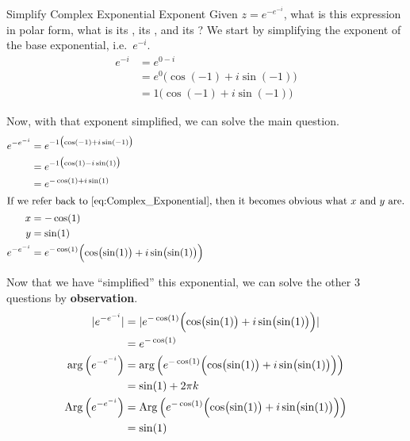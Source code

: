 \begin{example}[Lecture 3]{Simplify Complex Exponential Exponent}
  Given $z = e^{-e^{-i}}$, what is this expression in polar form, what is its , its , and its ?
  \tcblower{}
  We start by simplifying the exponent of the base exponential, i.e.\ $e^{-i}$.
  \begin{align*}
    e^{-i} &= e^{0 - i} \\
           &= e^{0} \bigl( \cos(-1) + i \sin(-1) \bigr) \\
           &= 1 \bigl( \cos(-1) + i \sin(-1) \bigr)
  \end{align*}

  Now, with that exponent simplified, we can solve the main question.
  \begin{align*}
    e^{-e^{-i}} &= e^{-1 \bigl( \cos(-1) + i \sin(-1) \bigr)} \\
                &= e^{-1 \bigl( \cos(1) - i \sin(1) \bigr)} \\
    &= e^{-\cos(1) + i \sin(1)} \\
    \intertext{If we refer back to \Cref{eq:Complex_Exponential}, then it becomes obvious what $x$ and $y$ are.}
    x &= -\cos(1) \\
    y &= \sin(1) \\
    e^{-e^{-i}} &= e^{-\cos(1)} \Bigl( \cos \bigl( \sin(1) \bigr) + i \sin \bigl( \sin(1) \bigr) \Bigr)
  \end{align*}

  Now that we have ``simplified'' this exponential, we can solve the other 3 questions by \textbf{observation}.
  \begin{align*}
    \lvert e^{-e^{-i}} \rvert &= \lvert e^{-\cos(1)} \Bigl( \cos \bigl( \sin(1) \bigr) + i \sin \bigl( \sin(1) \bigr) \Bigr) \rvert \\
                          &= e^{-\cos(1)} \\
    \arg \left( e^{-e^{-i}} \right) &= \arg \left( e^{-\cos(1)} \Bigl( \cos \bigl( \sin(1) \bigr) + i \sin \bigl( \sin(1) \bigr) \Bigr) \right) \\
                          &= \sin(1) + 2 \pi k \\
    \operatorname{Arg} \left( e^{-e^{-i}} \right) &= \operatorname{Arg} \left( e^{-\cos(1)} \Bigl( \cos \bigl( \sin(1) \bigr) + i \sin \bigl( \sin(1) \bigr) \Bigr) \right) \\
                          &= \sin(1)
  \end{align*}
\end{example}

